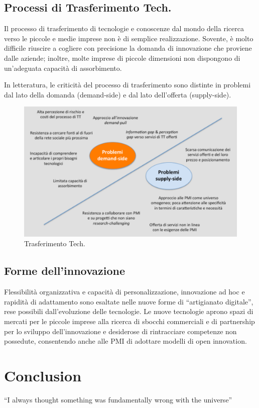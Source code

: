 \documentclass{article}
\begin{document}
\subsection{Processi di Trasferimento Tech.}
Il processo di trasferimento di tecnologie e conoscenze dal mondo della ricerca
verso le piccole e medie imprese non è di semplice realizzazione.
Sovente, è molto difficile riuscire a cogliere con precisione la domanda di
innovazione che proviene dalle aziende; inoltre, molte imprese di piccole
dimensioni non dispongono di un’adeguata capacità di assorbimento.

In letteratura, le criticità del processo di trasferimento sono
distinte in problemi dal lato della domanda (demand-side) e dal lato
dell’offerta (supply-side).


\begin{figure}[h!]
	\centering
	\includegraphics[scale=0.3]{images/ttf.png}
	\caption{Trasferimento Tech.}
	\label{fig:ttf}
\end{figure} 


\subsection{Forme dell'innovazione}
Flessibilità organizzativa e capacità di personalizzazione,
innovazione ad hoc e rapidità di adattamento sono esaltate nelle
nuove forme di “artigianato digitale”, rese possibili
dall’evoluzione delle tecnologie.
Le nuove tecnologie aprono spazi di mercati per le piccole
imprese alla ricerca di sbocchi commerciali e di partnership per lo
sviluppo dell’innovazione e desiderose di rintracciare competenze
non possedute, consentendo anche alle PMI di adottare modelli di
open innovation.

\section{Conclusion}
``I always thought something was fundamentally wrong with the universe'' \citep{adams1995hitchhiker}



\end{document}

